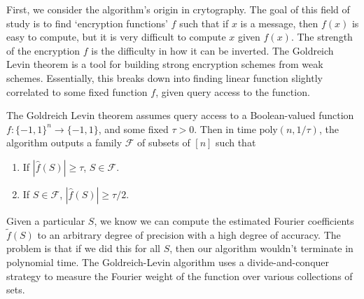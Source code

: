 First, we consider the algorithm's origin in crytography. The goal of this field of study is to find `encryption functions' $f$ such that if $x$ is a message, then $f(x)$ is easy to compute, but it is very difficult to compute $x$ given $f(x)$. The strength of the encryption $f$ is the difficulty in how it can be inverted. The Goldreich Levin theorem is a tool for building strong encryption schemes from weak schemes. Essentially, this breaks down into finding linear function slightly correlated to some fixed function $f$, given query access to the function.

The Goldreich Levin theorem assumes query access to a Boolean-valued function $f: \{ -1, 1 \}^n \to \{ -1, 1 \}$, and some fixed $\tau > 0$. Then in time $\text{poly}(n,1/\tau)$, the algorithm outputs a family $\mathcal{F}$ of subsets of $[n]$ such that
%
\begin{enumerate}
        \item If $|\widehat{f}(S)| \geq \tau$, $S \in \mathcal{F}$.
        \item If $S \in \mathcal{F}$, $|\widehat{f}(S)| \geq \tau/2$.
\end{enumerate}
%
Given a particular $S$, we know we can compute the estimated Fourier coefficients $\tilde{f}(S)$ to an arbitrary degree of precision with a high degree of accuracy. The problem is that if we did this for all $S$, then our algorithm wouldn't terminate in polynomial time. The Goldreich-Levin algorithm uses a divide-and-conquer strategy to measure the Fourier weight of the function over various collections of sets.

